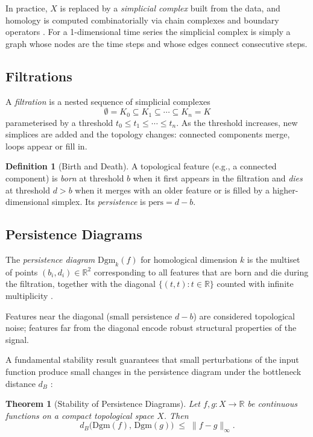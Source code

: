 \documentclass[12pt, a4paper]{article}
\theoremstyle{definition}
\newtheorem{definition}{Definition}[section]
\theoremstyle{plain}
\newtheorem{theorem}{Theorem}[section]
\newcommand{\R}{\mathbb{R}}
\newcommand{\dgm}{\mathrm{Dgm}}
\newcommand{\pers}{\mathrm{pers}}
\begin{document}
In practice, $X$ is replaced by a \emph{simplicial complex} built from the data,
and homology is computed combinatorially via chain complexes and boundary operators
\citep{hatcher2002algebraic}.
For a 1-dimensional time series the simplicial complex is simply a graph whose
nodes are the time steps and whose edges connect consecutive steps.

\subsection{Filtrations}

A \emph{filtration} is a nested sequence of simplicial complexes
\[
  \emptyset = K_0 \subseteq K_1 \subseteq \cdots \subseteq K_n = K
\]
parameterised by a threshold $t_0 \leq t_1 \leq \cdots \leq t_n$.
As the threshold increases, new simplices are added and the topology changes:
connected components merge, loops appear or fill in.

\begin{definition}[Birth and Death]
A topological feature (e.g., a connected component) is \emph{born} at threshold
$b$ when it first appears in the filtration and \emph{dies} at threshold $d > b$
when it merges with an older feature or is filled by a higher-dimensional simplex.
Its \emph{persistence} is $\pers = d - b$.
\end{definition}

\subsection{Persistence Diagrams}

The \emph{persistence diagram} $\dgm_k(f)$ for homological dimension $k$ is the
multiset of points $(b_i, d_i) \in \R^2$ corresponding to all features that are born
and die during the filtration, together with the diagonal $\{(t, t) : t \in \R\}$
counted with infinite multiplicity \citep{edelsbrunner2000topological}.

Features near the diagonal (small persistence $d - b$) are considered topological
noise; features far from the diagonal encode robust structural properties of the
signal.

A fundamental stability result guarantees that small perturbations of the input
function produce small changes in the persistence diagram under the bottleneck distance
$d_B$ \citep{cohen-steiner2007stability}:

\begin{theorem}[Stability of Persistence Diagrams]
Let $f, g : X \to \R$ be continuous functions on a compact topological space $X$.
Then
\[
  d_B\bigl(\dgm(f),\, \dgm(g)\bigr) \;\leq\; \|f - g\|_\infty.
\]
\end{theorem}
\end{document}
